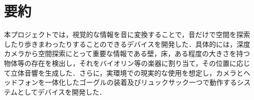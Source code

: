 \section{要約}
本プロジェクトでは，視覚的な情報を音に変換することで，音だけで空間を探索したり歩きまわったりすることのできるデバイスを開発した．具体的には，深度カメラから空間探索にとって重要な情報である壁，床，ある程度の大きさを持つ物体等の存在を検出し，それをバイオリン等の楽器に割り当て，その位置に応じて立体音響を生成した．さらに，実環境での現実的な使用を想定し，カメラとヘッドフォンを一体化したゴーグルの装着及びリュックサック一つで動作するシステムとしてデバイスを開発した．